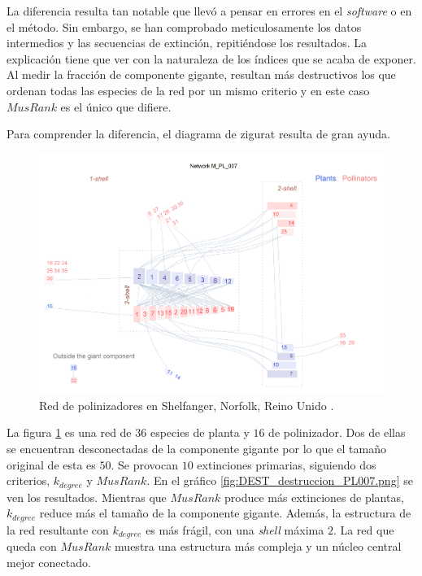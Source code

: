 La diferencia resulta tan notable que llevó a pensar en errores en el \textit{software} o en el método. Sin embargo, se han comprobado meticulosamente los datos intermedios y las secuencias de extinción, repitiéndose los resultados. La explicación tiene que ver con la naturaleza de los índices que se acaba de exponer. Al medir la fracción de componente gigante, resultan más destructivos los que ordenan todas las especies de la red por un mismo criterio y en este caso $MusRank$ es el único que difiere.

Para comprender la diferencia, el diagrama de zigurat resulta de gran ayuda.

\begin{figure}[h!]
\centering
\includegraphics[scale=0.45]{Figures/DEST_M_PL_007_ziggurat.png}
\caption {Red de polinizadores en Shelfanger, Norfolk, Reino Unido \cite{dicks2002compartmentalization}.}
\label{fig:DEST_M_PL_007_ziggurat.png}
\end{figure}

La figura \ref{fig:DEST_M_PL_007_ziggurat.png} es una red de $36$ especies de planta y $16$ de polinizador. Dos de ellas se encuentran desconectadas de la componente gigante por lo que el tamaño original de esta es $50$. Se provocan $10$ extinciones primarias, siguiendo dos criterios, ${k}_{degree}$ y $MusRank$. En el gráfico \ref{fig:DEST_destruccion_PL007.png} se ven los resultados. Mientras que $MusRank$ produce más extinciones de plantas, ${k}_{degree}$ reduce más el tamaño de la componente gigante. Además, la estructura de la red resultante con ${k}_{degree}$ es más frágil, con una \textit{shell} máxima $2$. La red que queda con $MusRank$ muestra una estructura más compleja y un núcleo central mejor conectado.

